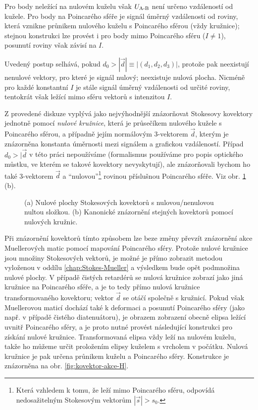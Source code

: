 Pro body neležící na nulovém kuželu však $U_\textrm{A-B}$ není určeno vzdáleností od kužele.
Pro body na Poincarého sféře je signál úměrný vzdálenosti od roviny, která vznikne průnikem nulového kuželu s Poincarého sférou (vždy kružnice); stejnou konstrukci lze provést i pro body mimo Poincarého sféru ($I\neq1$), posunutí roviny však závisí na $I$.

Uvedený postup selhává, pokud $d_0>|\vec{d}|\equiv|(d_1, d_2, d_3)|$, protože pak neexistují nenulové vektory, pro které je signál nulový; neexistuje nulová plocha.
Nicméně pro každé konstantní $I$ je stále signál úměrný vzdálenosti od určité roviny, tentokrát však ležící mimo sféru vektorů s intenzitou $I$.

Z provedené diskuze vyplývá jako nejvýhodnější znázorňovat Stokesovy kovektory jednotně pomocí \emph{nulové kružnice}, která je průsečíkem nulového kužele s Poincarého sférou, a případně jejím normálovým 3-vektorem $\vec{d}$, kterým je znázorněna konstanta úměrnosti mezi signálem a grafickou vzdáleností.
Případ $d_0>|\vec{d}$ v této práci nepoužíváme (formalismus používáme pro popis optického můstku, ve kterém se takové kovektory nevyskytují), ale znázorňovali bychom ho také 3-vektorem $\vec{d}$ a ``nulovou''\footnote{Která vzhledem k tomu, že leží mimo Poincarého sféru, odpovídá nedosažitelným Stokesovým vektorům $|\vec{s}|>s_0$.} rovinou příslušnou Poincarého sféře.
Viz obr. \ref{fig:mustek-znazorneni-kovektoru} (b).

\begin{figure}[htbp]
    \centering
    \caption{(a) Nulové plochy Stokesových kovektorů s nulovou/nenulovou nultou složkou. (b) Kanonické znázornění stejných kovektorů pomocí nulových kružnic.}
    \label{fig:mustek-znazorneni-kovektoru}
\end{figure}

Při znázornění kovektorů tímto způsobem lze beze změny převzít znázornění akce Muellerových matic pomocí mapování Poincarého sféry.
Protože nulové kružnice jsou množiny Stokesových vektorů, je možné je přímo zobrazit metodou vyloženou v oddílu \ref{chap:Stokes-Mueller} a výsledkem bude opět podmnožina nulové plochy.
V případě čistých retardérů se nulová kružnice zobrazí jako jiná kružnice na Poincarého sféře, a je to tedy přímo nulová kružnice transformovaného kovektoru; vektor $\vec{d}$ se otáčí společně s kružnicí.
Pokud však Muellerovou maticí dochází také k deformaci a posunutí Poincarého sféry (jako např. v případě čistého diatenuátoru), je obrazem zobrazení obecně elipsa ležící uvnitř Poincarého sféry, a je proto nutné provést následující konstrukci pro získání nulové kružnice.
Transformovaná elipsa vždy leží na nulovém kuželu, takže ho můžeme určit proložením elipsy kuželem s vrcholem v počátku.
Nulová kružnice je pak určena průnikem kuželu a Poincarého sféry.
Konstrukce je znázorněna na obr. \ref{fig:kovektor-akce-H}.


